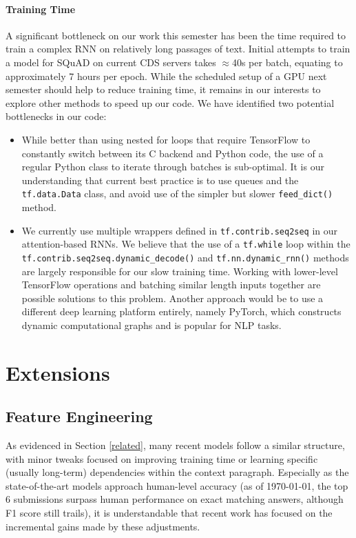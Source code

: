 \documentclass{article}
\begin{document}
\paragraph{Training Time}
A significant bottleneck on our work this semester has been the time required to train a complex RNN on relatively long passages of text. Initial attempts to train a model for SQuAD on current CDS servers takes $\approx$40s per batch, equating to approximately 7 hours per epoch. While the scheduled setup of a GPU next semester should help to reduce training time, it remains in our interests to explore other methods to speed up our code. We have identified two potential bottlenecks in our code:
\begin{itemize}
	\item While better than using nested for loops that require TensorFlow to constantly switch between its C backend and Python code, the use of a regular Python class to iterate through batches is sub-optimal. It is our understanding that current best practice is to use queues and the \texttt{tf.data.Data} class, and avoid use of the simpler but slower \texttt{feed\_dict()} method. 

	\item We currently use multiple wrappers defined in \texttt{tf.contrib.seq2seq} in our attention-based RNNs. We believe that the use of a \texttt{tf.while} loop within the \texttt{tf.contrib.seq2seq.dynamic\_decode()} and \texttt{tf.nn.dynamic\_rnn()} methods are largely responsible for our slow training time. Working with lower-level TensorFlow operations and batching similar length inputs together are possible solutions to this problem. Another approach would be to use a different deep learning platform entirely, namely PyTorch, which constructs dynamic computational graphs and is popular for NLP tasks.  
\end{itemize}


\section{Extensions} \label{extensions}
\subsection{Feature Engineering}
As evidenced in Section \ref{related}, many recent models follow a similar structure, with minor tweaks focused on improving training time or learning specific (usually long-term) dependencies within the context paragraph. Especially as the state-of-the-art models approach human-level accuracy (as of \today, the top 6 submissions surpass human performance on exact matching answers, although F1 score still trails), it is understandable that recent work has focused on the incremental gains made by these adjustments. 
\end{document}
